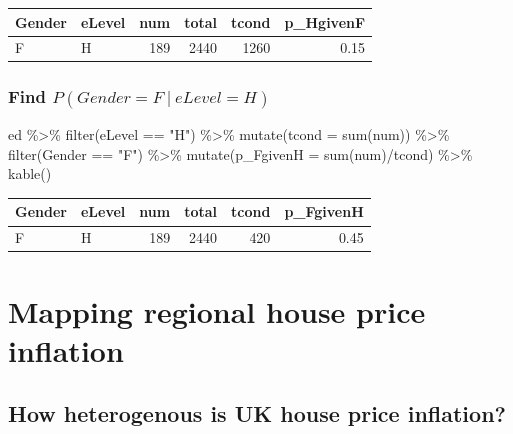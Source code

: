 \documentclass[
  letterpaper,
]{book}
\newenvironment{Shaded}{\begin{snugshade}}{\end{snugshade}}
\newcommand{\AttributeTok}[1]{\textcolor[rgb]{0.40,0.45,0.13}{#1}}
\newcommand{\FunctionTok}[1]{\textcolor[rgb]{0.28,0.35,0.67}{#1}}
\newcommand{\NormalTok}[1]{\textcolor[rgb]{0.00,0.23,0.31}{#1}}
\newcommand{\SpecialCharTok}[1]{\textcolor[rgb]{0.37,0.37,0.37}{#1}}
\newcommand{\StringTok}[1]{\textcolor[rgb]{0.13,0.47,0.30}{#1}}
\begin{document}
\begin{longtable}[]{@{}llrrrr@{}}
\toprule\noalign{}
Gender & eLevel & num & total & tcond & p\_HgivenF \\
\midrule\noalign{}
\endhead
\bottomrule\noalign{}
\endlastfoot
F & H & 189 & 2440 & 1260 & 0.15 \\
\end{longtable}

\hypertarget{find-pgender-f-elevel-h}{%
\subsection{\texorpdfstring{Find
\(P(Gender = F\ | \ eLevel = H)\)}{Find P(Gender = F\textbackslash{} \textbar{} \textbackslash{} eLevel = H)}}\label{find-pgender-f-elevel-h}}

\begin{Shaded}
\begin{Highlighting}[]
\NormalTok{ed }\SpecialCharTok{\%\textgreater{}\%}
  \FunctionTok{filter}\NormalTok{(eLevel }\SpecialCharTok{==} \StringTok{"H"}\NormalTok{) }\SpecialCharTok{\%\textgreater{}\%}
  \FunctionTok{mutate}\NormalTok{(}\AttributeTok{tcond =} \FunctionTok{sum}\NormalTok{(num)) }\SpecialCharTok{\%\textgreater{}\%} 
  \FunctionTok{filter}\NormalTok{(Gender }\SpecialCharTok{==} \StringTok{"F"}\NormalTok{) }\SpecialCharTok{\%\textgreater{}\%}
  \FunctionTok{mutate}\NormalTok{(}\AttributeTok{p\_FgivenH =} \FunctionTok{sum}\NormalTok{(num)}\SpecialCharTok{/}\NormalTok{tcond) }\SpecialCharTok{\%\textgreater{}\%}
  \FunctionTok{kable}\NormalTok{()}
\end{Highlighting}
\end{Shaded}

\begin{longtable}[]{@{}llrrrr@{}}
\toprule\noalign{}
Gender & eLevel & num & total & tcond & p\_FgivenH \\
\midrule\noalign{}
\endhead
\bottomrule\noalign{}
\endlastfoot
F & H & 189 & 2440 & 420 & 0.45 \\
\end{longtable}

\hypertarget{mapping-regional-house-price-inflation}{%
\chapter{Mapping regional house price
inflation}\label{mapping-regional-house-price-inflation}}

\hypertarget{how-heterogenous-is-uk-house-price-inflation}{%
\section{How heterogenous is UK house price
inflation?}\label{how-heterogenous-is-uk-house-price-inflation}}
\end{document}
